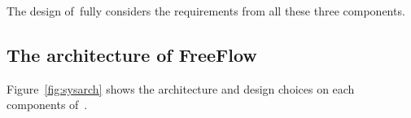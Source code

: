 The design of~\sysname fully considers the requirements from all these three
components.

\subsection{The architecture of FreeFlow}

Figure~\ref{fig:sysarch} shows the architecture and design choices on each 
components of~\sysname.




